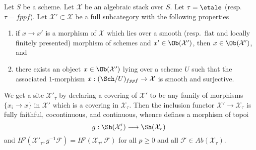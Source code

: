 \begin{lemma}
\label{lemma-cohomology-on-subcategory}
Let $S$ be a scheme. Let $\mathcal{X}$ be an algebraic stack over $S$.
Let $\tau = \etale$ (resp.\ $\tau = fppf$). Let
$\mathcal{X}' \subset \mathcal{X}$ be a full subcategory with the
following properties
\begin{enumerate}
\item if $x \to x'$ is a morphism of $\mathcal{X}$ which lies over a
smooth (resp.\ flat and locally finitely presented) morphism of
schemes and $x' \in \Ob(\mathcal{X}')$, then $x \in \Ob(\mathcal{X}')$, and
\item there exists an object $x \in \Ob(\mathcal{X}')$ lying over
a scheme $U$ such that the associated $1$-morphism
$x : (\Sch/U)_{fppf} \to \mathcal{X}$ is smooth and surjective.
\end{enumerate}
We get a site $\mathcal{X}'_\tau$ by declaring a covering of $\mathcal{X}'$
to be any family of morphisms $\{x_i \to x\}$ in $\mathcal{X}'$ which is a
covering in $\mathcal{X}_\tau$. Then the inclusion functor
$\mathcal{X}' \to \mathcal{X}_\tau$ is fully faithful, cocontinuous, and
continuous, whence defines a morphism of topoi
$$
g : \Sh(\mathcal{X}'_\tau) \longrightarrow \Sh(\mathcal{X}_\tau)
$$
and $H^p(\mathcal{X}'_\tau, g^{-1}\mathcal{F}) =
H^p(\mathcal{X}_\tau, \mathcal{F})$ for all $p \geq 0$ and all
$\mathcal{F} \in \textit{Ab}(\mathcal{X}_\tau)$.
\end{lemma}

